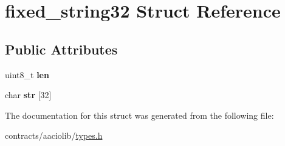 \hypertarget{structfixed__string32}{}\section{fixed\+\_\+string32 Struct Reference}
\label{structfixed__string32}
\subsection*{Public Attributes}
\begin{DoxyCompactItemize}
\item 
\mbox{\label{structfixed__string32_a96c1e739f58582562c539d733d6f18b0}} 
uint8\+\_\+t {\bfseries len}
\item 
\mbox{\label{structfixed__string32_a7e091b3678b9e957f6d5ba42d443c217}} 
char {\bfseries str} \mbox{[}32\mbox{]}
\end{DoxyCompactItemize}


The documentation for this struct was generated from the following file\+:\begin{DoxyCompactItemize}
\item 
contracts/aaciolib/\mbox{\hyperlink{contracts_2aaciolib_2types_8h}{types.\+h}}\end{DoxyCompactItemize}
